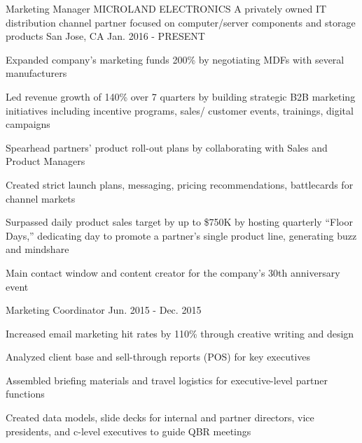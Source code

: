 

\begin{cventries}

  \cventry
    {Marketing Manager} %
    {MICROLAND ELECTRONICS  \newline \textnormal{A privately owned IT distribution channel partner focused on computer/server components and storage products}} %
    {San Jose, CA} %
    {Jan. 2016 - PRESENT} %
    {
      \begin{cvitems} %
               \item {Expanded company’s marketing funds 200\% by negotiating MDFs with several manufacturers}
       \item {Led revenue growth of 140\% over 7 quarters by building strategic B2B marketing initiatives \newline including incentive programs, sales/ customer events, trainings, digital campaigns}
        \item {Spearhead partners’ product roll-out plans by collaborating with Sales and Product Managers}
        \item {Created strict launch plans, messaging, pricing recommendations, battlecards for channel markets}
        \item {Surpassed daily product sales target by up to \$750K by hosting quarterly “Floor Days,” dedicating  day to promote a partner’s single product line, generating buzz and mindshare}
        \item {Main contact window and content creator for the company’s 30th anniversary event}
      \end{cvitems}
    }

  \cventry
    {Marketing Coordinator} %
    {} %
    {} %
    {Jun. 2015 - Dec. 2015} %
    {
      \begin{cvitems} %
        \item {Increased email marketing hit rates by 110\% through creative writing and design}
        \item {Analyzed client base and sell-through reports (POS) for key executives}
        \item {Assembled briefing materials and travel logistics for executive-level partner functions}
                \item {Created data models, slide decks for internal and partner directors, vice presidents, and \newline c-level executives to guide QBR meetings}
      \end{cvitems}
    }

  
\end{cventries}
